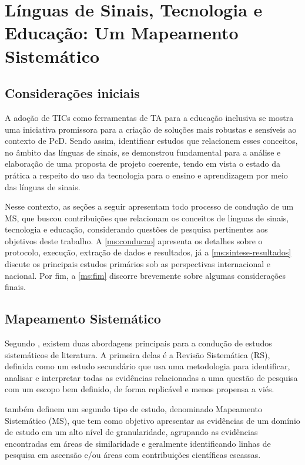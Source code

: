 \chapter{Línguas de Sinais, Tecnologia e Educação: Um Mapeamento Sistemático}
\label{chapter:mapeamento-sistematico}

\section{Considerações iniciais}
\label{ms:inicio}

A adoção de TICs como ferramentas de TA para a educação inclusiva se mostra uma iniciativa promissora para a criação de soluções mais robustas e sensíveis ao contexto de PcD. Sendo assim, identificar estudos que relacionem esses conceitos, no âmbito das línguas de sinais, se demonstrou fundamental para a análise e elaboração de uma proposta de projeto coerente, tendo em vista o estado da prática a respeito do uso da tecnologia para o ensino e aprendizagem por meio das línguas de sinais.

Nesse contexto, as seções a seguir apresentam todo processo de condução de um MS, que buscou contribuições que relacionam os conceitos de línguas de sinais, tecnologia e educação, considerando questões de pesquisa pertinentes aos objetivos deste trabalho. A \autoref{ms:conducao} apresenta os detalhes sobre o protocolo, execução, extração de dados e resultados, já a \autoref{ms:sintese-resultados} discute os principais estudos primários sob as perspectivas internacional e nacional. Por fim, a \autoref{ms:fim} discorre brevemente sobre algumas considerações finais.

\section{Mapeamento Sistemático}
\label{ms:conducao}

Segundo , existem duas abordagens principais para a condução de estudos sistemáticos de literatura. A primeira delas é a Revisão Sistemática (RS), definida como um estudo secundário que usa uma metodologia para identificar, analisar e interpretar todas as evidências relacionadas a uma questão de pesquisa com um escopo bem definido, de forma replicável e menos propensa a viés.

 também definem um segundo tipo de estudo, denominado Mapeamento Sistemático (MS), que tem como objetivo apresentar as evidências de um domínio de estudo em um alto nível de granularidade, agrupando as evidências encontradas em áreas de similaridade e geralmente identificando linhas de pesquisa em ascensão e/ou áreas com contribuições científicas escassas.

